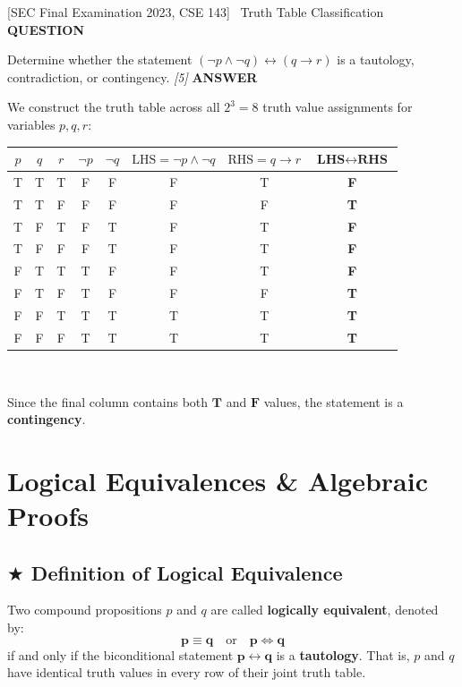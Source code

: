 \documentclass[11pt,a4paper]{article}
\newcommand{\Qlabel}{\textbf{\color{navy}\footnotesize\MakeUppercase{Question}}\par\smallskip}
\newcommand{\Alabel}{\textbf{\color{teal}\footnotesize\MakeUppercase{Answer}}\par\smallskip}
\begin{document}
\begin{exambox}{[SEC Final Examination 2023, CSE 143] \ Truth Table Classification}
\Qlabel
Determine whether the statement $(\neg p \wedge \neg q) \leftrightarrow (q \rightarrow r)$ is a tautology, contradiction, or contingency. \hfill\textit{[5]}
\tcblower
\Alabel
We construct the truth table across all $2^3 = 8$ truth value assignments for variables $p, q, r$:\\[2pt]
\centering
\renewcommand{\arraystretch}{1.02}
\small
\begin{tabular}{|c|c|c|c|c|c|c|c|}
\hline
\rowcolor{navy!15} $p$ & $q$ & $r$ & $\neg p$ & $\neg q$ & $\text{LHS} = \neg p \wedge \neg q$ & $\text{RHS} = q \rightarrow r$ & $\mathbf{\text{LHS} \leftrightarrow \text{RHS}}$ \\
\hline
T & T & T & F & F & F & T & \textbf{F} \\
T & T & F & F & F & F & F & \textbf{T} \\
T & F & T & F & T & F & T & \textbf{F} \\
T & F & F & F & T & F & T & \textbf{F} \\
F & T & T & T & F & F & T & \textbf{F} \\
F & T & F & T & F & F & F & \textbf{T} \\
F & F & T & T & T & T & T & \textbf{T} \\
F & F & F & T & T & T & T & \textbf{T} \\
\hline
\end{tabular}\\[3pt]
\raggedright
Since the final column contains both $\mathbf{T}$ and $\mathbf{F}$ values, the statement is a \textbf{contingency}.
\end{exambox}

\newpage

\section{Logical Equivalences \& Algebraic Proofs}

\subsection{\texorpdfstring{$\bigstar$ }{*}Definition of Logical Equivalence}
\begin{defbox}
Two compound propositions $p$ and $q$ are called \textbf{logically equivalent}, denoted by:
\[
\mathbf{p \equiv q} \quad \text{or} \quad \mathbf{p \iff q}
\]
if and only if the biconditional statement $\mathbf{p \leftrightarrow q}$ is a \textbf{tautology}. That is, $p$ and $q$ have identical truth values in every row of their joint truth table.
\end{defbox}
\end{document}
